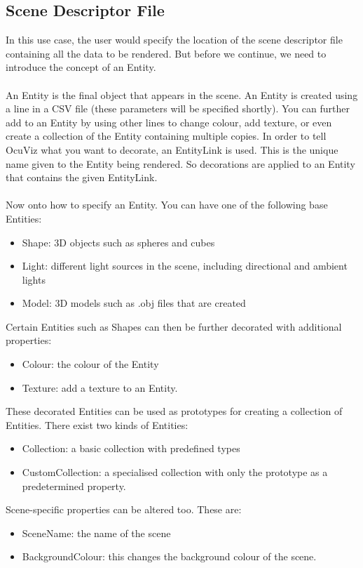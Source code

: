 \documentclass[a4paper,12pt]{article}
\begin{document}
\subsection{Scene Descriptor File}
In this use case, the user would specify the location of the scene descriptor file containing all the data to be rendered. But before we continue, we need to introduce the concept of an Entity. 
\\\\
An Entity is the final object that appears in the scene. An Entity is created using a line in a CSV file (these parameters will be specified shortly). You can further add to an Entity by using other lines to change colour, add texture, or even create a collection of the Entity containing multiple copies. In order to tell OcuViz what you want to decorate, an EntityLink is used. This is the unique name given to the Entity being rendered. So decorations are applied to an Entity that contains the given EntityLink.
\\
\\
Now onto how to specify an Entity. You can have one of the following base Entities:
\begin{itemize}
\item Shape: 3D objects such as spheres and cubes
\item Light: different light sources in the scene, including directional and ambient lights
\item Model: 3D models such as .obj files that are created
\end{itemize}

Certain Entities such as Shapes can then be further decorated with additional properties:
\begin{itemize}
\item Colour: the colour of the Entity
\item Texture: add a texture to an Entity.
\end{itemize}

These decorated Entities can be used as prototypes for creating a collection of Entities. There exist two kinds of Entities:
\begin{itemize}
\item Collection: a basic collection with predefined types
\item CustomCollection: a specialised collection with only the prototype as a predetermined property.
\end{itemize}

Scene-specific properties can be altered too. These are:
\begin{itemize}
\item SceneName: the name of the scene
\item BackgroundColour: this changes the background colour of the scene.
\end{itemize}
\end{document}
